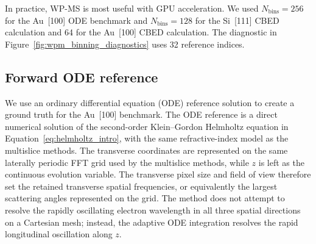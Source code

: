 \documentclass[preprint,12pt,number]{elsarticle}
\begin{document}
In practice, WP-MS is most useful with GPU acceleration. We used
$N_{\mathrm{bins}}=256$ for the Au~[100] ODE benchmark and
$N_{\mathrm{bins}}=128$ for the Si~[111] CBED calculation and 64 for the
Au~[100] CBED calculation. The diagnostic in
Figure~\ref{fig:wpm_binning_diagnostics} uses 32 reference indices.

\subsection{Forward ODE reference}
\label{sec:forward_ode_reference}

We use an ordinary differential equation (ODE) reference solution 
to create a ground truth for the Au~[100] benchmark. The ODE reference is a direct numerical solution of the second-order Klein--Gordon Helmholtz equation
in Equation~\eqref{eq:helmholtz_intro}, with the same refractive-index model as the
multislice methods. 
The transverse coordinates are represented on the same laterally
periodic FFT grid used by the multislice methods, while $z$ is left as the
continuous evolution variable. The transverse pixel size and field of view
therefore set the retained transverse spatial frequencies, or equivalently the
largest scattering angles represented on the grid. The method does not attempt
to resolve the rapidly oscillating electron wavelength in all three spatial
directions on a Cartesian mesh; instead, the adaptive ODE integration resolves
the rapid longitudinal oscillation along $z$.
\end{document}
